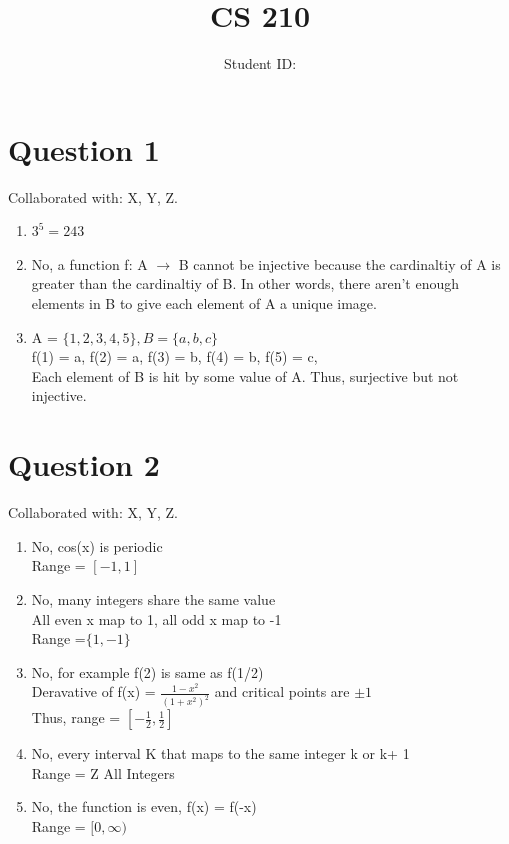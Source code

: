 \documentclass[twoside]{article}
\title{CS 210 \hwNo}
\author{\myname \qquad Student ID:\myid}
\date{\currentdate}
\begin{document}
\maketitle

\section*{Question 1}
Collaborated with: X, Y, Z.
\begin{enumerate}
    \item[(a)]  $3^5 = 243$
    \item[(b)]  No, a function f: A $ \rightarrow$ B cannot be injective because the cardinaltiy of A is greater than the cardinaltiy of B.
                In other words, there aren't enough elements in B to give each element of A a unique image.
    \item[(c)]  A = $\{1,2,3,4,5\}, B = \{a, b, c\}$ \\
                \quad f(1) = a, 
                \quad f(2) = a,
                \quad f(3) = b,
                \quad f(4) = b,
                \quad f(5) = c, \\
                Each element of B is hit by some value of A. Thus, surjective but not injective. 
\end{enumerate}

\section*{Question 2}
Collaborated with: X, Y, Z.
\begin{enumerate}
    
    \item[A.]  No, cos(x) is periodic \\ 
               Range = $[-1, 1]$
    \item[B.]  No, many integers share the same value \\
               All even x map to 1, all odd x map to -1 \\
               Range =$ \{1, -1\} $
    \item[C.]  No, for example f(2) is same as f(1/2) \\
               Deravative of f(x) = $ \frac{1 -x^2}{ (1+x^2)^2}$ and critical points are $\pm 1$ \\
               Thus, range = $[-\tfrac{1}{2}, \tfrac{1}{2}]$
    \item[D.]  No, every interval K that maps to the same integer k or k+ 1\\
               Range = Z All Integers
    \item[E.]  No, the function is even,  f(x) = f(-x) \\
               Range = $[0, \infty)$
\end{enumerate}
\end{document}
